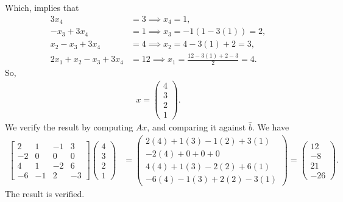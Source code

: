 \documentclass{report}
\begin{document}
    Which, implies that
    \begin{align*}
        3x_{4} &= 3 \implies x_{4} = 1, \\
        -x_{3} + 3x_{4} &= 1\implies x_{3} = -1(1-3(1)) = 2, \\
        x_{2} - x_{3} + 3x_{4} &= 4 \implies x_{2} = 4-3(1)+2 = 3, \\
        2x_{1} + x_{2} - x_{3} + 3x_{4} &= 12 \implies x_{1} = \frac{12-3(1)+2-3}{2} = 4
    .\end{align*}
    So,
    \begin{align*}
        x = \begin{pmatrix} 4 \\ 3 \\ 2 \\ 1 \end{pmatrix}
    .\end{align*}
    We verify the result by computing $Ax$, and comparing it against $\hat{b}$. We have
    \begin{align*}
        \begin{bmatrix} 2 & 1 & -1 & 3 \\ -2 & 0 & 0 & 0 \\ 4 & 1 & -2 & 6 \\ -6 & -1 & 2 & -3 \end{bmatrix} \begin{pmatrix} 4 \\ 3 \\ 2 \\ 1 \end{pmatrix} &= \begin{pmatrix} 2(4) + 1(3) - 1(2) + 3(1) \\ -2(4) + 0 + 0 + 0 \\ 4(4)  +1(3) -2(2) +6(1) \\ -6(4) -1(3) + 2(2)-3(1) \end{pmatrix} = \begin{pmatrix} 12 \\ -8 \\ 21 \\ -26 \end{pmatrix}
    .\end{align*}
    The result is verified.
\end{document}
